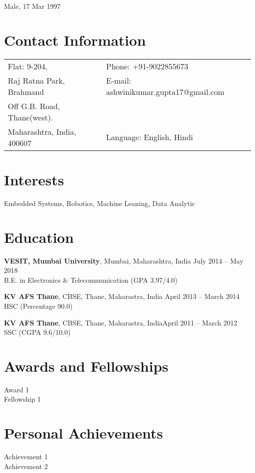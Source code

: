 \documentclass[margin,line]{res}
\begin{document}
 \hfill {Male, 17 Mar 1997}

\begin{resume}
\section{\sc Contact Information}

\vspace{.05in}
\begin{tabular}{@{}p{3.5in}p{3in}}
Flat: 9-204,             & {Phone:}  +91-9022855673 \\
Raj Ratna Park, Brahmand 
 & {E-mail:}  ashwinikumar.gupta17@gmail.com\\
Off G.B. Road, Thane(west).\\
Maharashtra, India, 400607  & {Language: English, Hindi} %
\end{tabular}


\section{\sc Interests}

Embedded Systems, Robotics, Machine Leaning, Data Analytic

\section{\sc Education}
{\bf VESIT, Mumbai University}, Mumbai, Maharashtra, India \hfill July 2014 -- May 2018\\
B.E. in Electronics \& Telecommunication \hfill(GPA 3.97/4.0)

{\bf KV AFS Thane}, CBSE, Thane, Maharastra, India \hfill April 2013 -- March 2014\\
HSC \hfill(Percentage 90.0)

{\bf KV AFS Thane}, CBSE, Thane, Maharastra, India\hfill  April 2011 -- March 2012\\
SSC \hfill(CGPA 9.6/10.0)
\section{\sc Awards and Fellowships}
Award 1\\
Fellowship 1\\
\section{\sc Personal Achievements}
Achievement 1\\
Achievement 2\\

\end{resume}
\end{document}
